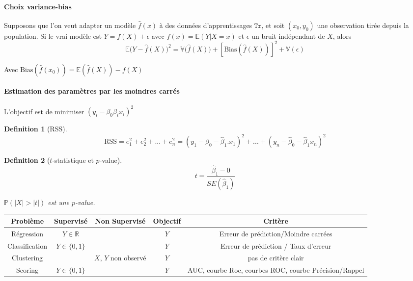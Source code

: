 \documentclass{article}
\newtheorem{defi}{Definition}
\begin{document}
\paragraph{Choix variance-bias} Supposons que l'on veut adapter un modèle $\hat{f}(x)$ à des données d'apprentissages $\mathtt{Tr}$, et soit $(x_0, y_0)$ une observation tirée depuis la population. Si le vrai modèle est $Y= f(X) + \epsilon$ avec $f(x)=\mathbb{E}(Y|X=x)$ et $\epsilon$ un bruit indépendant de $X$, alors
\[\mathbb{E}\Big(Y - \hat{f}(X)\Big)^2 = \mathbb{V}\big(\hat{f}(X)\big) + [\text{Bias}(\hat{f}(X))]^2 + \mathbb{V}(\epsilon)\]

Avec $\text{Bias}(\hat{f}(x_0))=\mathbb{E}(\hat{f}(X))-f(X)$

\paragraph{Estimation des paramètres par les moindres carrés}
L'objectif est de minimiser $(y_i - \beta_0 \beta_i x_i)^2$

\begin{defi}[RSS]
\[\text{RSS} = e_1^2 + e_2^2 + ... + e_n^2 = (y_1 - \hat{\beta}_0 - \hat{\beta}_1.x_1)^2 + ... + (y_n - \hat{\beta}_0 - \hat{\beta}_1 x_n)^2\]
\end{defi}

\begin{defi}[$t$-statistique et $p$-value]
\[t=\dfrac{\hat{\beta}_1 - 0}{SE(\hat{\beta}_1)}\]

$\mathbb{P}(|X|>|t|)$ est une $p$-value.
\end{defi}



\begin{adjustbox}{max width=\textwidth}
\begin{tabular}{c|c|c|c|c}
Problème & Supervisé & Non Supervisé & Objectif & Critère\\
\hline
Régression & $Y\in \mathbb{R}$ & & $Y$ & Erreur de prédiction/Moindre carrées\\
Classification & $Y\in \{0,1\}$ & & $Y$ & Erreur de prédiction / Taux d'erreur\\
Clustering & & $X$, $Y$ non observé & $Y$ & pas de critère clair\\
Scoring & $Y\in\{ 0, 1\}$ & & $Y$ & AUC, courbe Roc, courbes ROC, courbe Précision/Rappel\\
\hline
\end{tabular}
\end{adjustbox}
\end{document}
